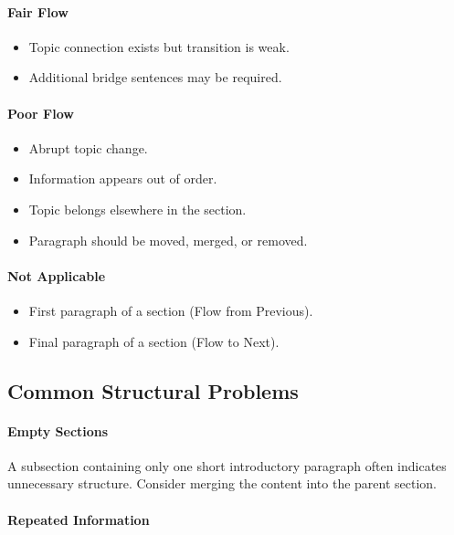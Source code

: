 \paragraph{Fair Flow}

\begin{itemize}
\item Topic connection exists but transition is weak.
\item Additional bridge sentences may be required.
\end{itemize}

\paragraph{Poor Flow}

\begin{itemize}
\item Abrupt topic change.
\item Information appears out of order.
\item Topic belongs elsewhere in the section.
\item Paragraph should be moved, merged, or removed.
\end{itemize}

\paragraph{Not Applicable}

\begin{itemize}
\item First paragraph of a section (Flow from Previous).
\item Final paragraph of a section (Flow to Next).
\end{itemize}

\subsection{Common Structural Problems}

\paragraph{Empty Sections}

A subsection containing only one short introductory paragraph often
indicates unnecessary structure. Consider merging the content into the
parent section.

\paragraph{Repeated Information}

